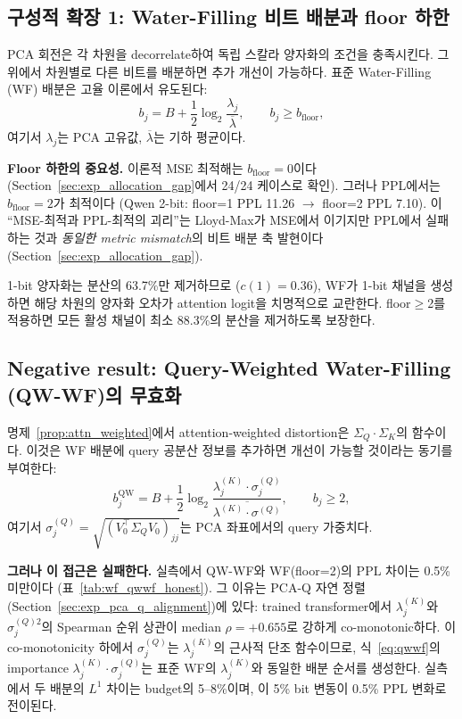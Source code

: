 \subsection{구성적 확장 1: Water-Filling 비트 배분과 floor 하한}
\label{sec:method_wf}

PCA 회전은 각 차원을 decorrelate하여 독립 스칼라 양자화의 조건을 충족시킨다. 그 위에서 차원별로 다른 비트를 배분하면 추가 개선이 가능하다. 표준 Water-Filling (WF) 배분은 고율 이론에서 유도된다:
\begin{equation}
b_j = B + \frac{1}{2}\log_2\frac{\lambda_j}{\overline{\lambda}}, \qquad b_j \geq b_{\mathrm{floor}},
\label{eq:wf}
\end{equation}
여기서 $\lambda_j$는 PCA 고유값, $\overline{\lambda}$는 기하 평균이다.

\textbf{Floor 하한의 중요성.} 이론적 MSE 최적해는 $b_{\mathrm{floor}} = 0$이다 (Section~\ref{sec:exp_allocation_gap}에서 24/24 케이스로 확인). 그러나 PPL에서는 $b_{\mathrm{floor}} = 2$가 최적이다 (Qwen 2-bit: floor=1 PPL 11.26 $\to$ floor=2 PPL 7.10). 이 ``MSE-최적과 PPL-최적의 괴리''는 Lloyd-Max가 MSE에서 이기지만 PPL에서 실패하는 것과 \emph{동일한 metric mismatch}의 비트 배분 축 발현이다 (Section~\ref{sec:exp_allocation_gap}).

1-bit 양자화는 분산의 63.7\%만 제거하므로 ($c(1) = 0.36$), WF가 1-bit 채널을 생성하면 해당 차원의 양자화 오차가 attention logit을 치명적으로 교란한다. floor$\geq$2를 적용하면 모든 활성 채널이 최소 88.3\%의 분산을 제거하도록 보장한다.

\subsection{Negative result: Query-Weighted Water-Filling (QW-WF)의 무효화}
\label{sec:method_qwwf}

명제~\ref{prop:attn_weighted}에서 attention-weighted distortion은 $\Sigma_Q \cdot \Sigma_K$의 함수이다. 이것은 WF 배분에 query 공분산 정보를 추가하면 개선이 가능할 것이라는 동기를 부여한다:
\begin{equation}
b_j^{\mathrm{QW}} = B + \frac{1}{2}\log_2\frac{\lambda_j^{(K)} \cdot \sigma_j^{(Q)}}{\overline{\lambda^{(K)} \cdot \sigma^{(Q)}}}, \qquad b_j \geq 2,
\label{eq:qwwf}
\end{equation}
여기서 $\sigma_j^{(Q)} = \sqrt{(V_0^\top \Sigma_Q V_0)_{jj}}$는 PCA 좌표에서의 query 가중치다.

\textbf{그러나 이 접근은 실패한다.} 실측에서 QW-WF와 WF(floor=2)의 PPL 차이는 0.5\% 미만이다 (표~\ref{tab:wf_qwwf_honest}). 그 이유는 PCA-Q 자연 정렬 (Section~\ref{sec:exp_pca_q_alignment})에 있다: trained transformer에서 $\lambda_j^{(K)}$와 $\sigma_j^{(Q)2}$의 Spearman 순위 상관이 median $\rho = +0.655$로 강하게 co-monotonic하다. 이 co-monotonicity 하에서 $\sigma_j^{(Q)}$는 $\lambda_j^{(K)}$의 근사적 단조 함수이므로, 식~\eqref{eq:qwwf}의 importance $\lambda_j^{(K)} \cdot \sigma_j^{(Q)}$는 표준 WF의 $\lambda_j^{(K)}$와 동일한 배분 순서를 생성한다. 실측에서 두 배분의 $L^1$ 차이는 budget의 5--8\%이며, 이 5\% bit 변동이 0.5\% PPL 변화로 전이된다.

